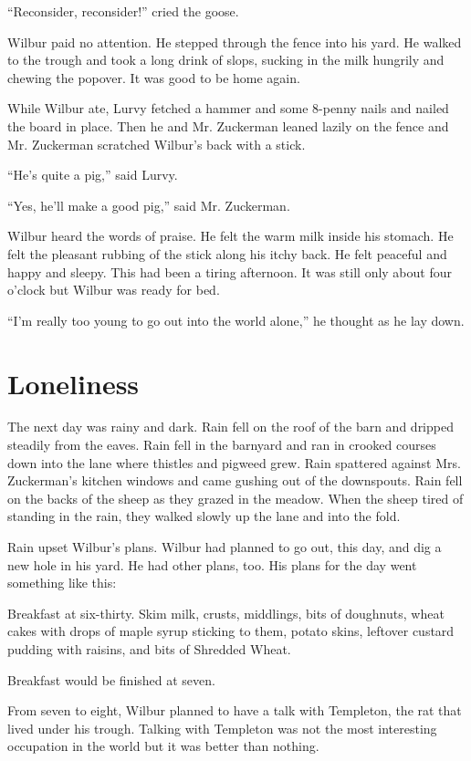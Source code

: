 \documentclass[a4paper, oneside]{book}
\begin{document}
 ``Reconsider, reconsider!'' cried the goose.  

  Wilbur paid no attention. He stepped through the fence into his
yard. He walked to the trough and took a long drink of slops,
sucking in the milk hungrily and chewing the popover. It was good
to be home again.

 While Wilbur ate, Lurvy fetched a hammer and some 8-penny
nails and nailed the board in place. Then he and Mr. Zuckerman
leaned lazily on the fence and Mr. Zuckerman scratched Wilbur's
back with a stick.

 ``He's quite a pig,'' said Lurvy.
 
 ``Yes, he'll make a good pig,'' said Mr. Zuckerman.
 
 Wilbur heard the words of praise. He felt the warm milk inside his
stomach. He felt the pleasant rubbing of the stick along his itchy
back. He felt peaceful and happy and sleepy. This had been a tiring
afternoon. It was still only about four o'clock but Wilbur was ready 
for bed.

 ``I'm really too young to go out into the world alone,'' he thought
as he lay down.


 
  \chapter{Loneliness}
 
 The next day was rainy and dark. Rain fell on the roof of the barn
and dripped steadily from the eaves. Rain fell in the barnyard and
ran in crooked courses down into the lane where thistles and
pigweed grew. Rain spattered against Mrs. Zuckerman's kitchen
windows and came gushing out of the downspouts. Rain fell on the
backs of the sheep as they grazed in the meadow. When the sheep
tired of standing in the rain, they walked slowly up the lane and
into the fold.

 Rain upset Wilbur's plans. Wilbur had planned to go out, this day,
and dig a new hole in his yard. He had other plans, too. His plans
for the day went something like this: 

Breakfast at six-thirty. Skim milk, crusts, middlings, bits of
doughnuts, wheat cakes with drops of maple syrup sticking to them,
potato skins, leftover custard pudding with raisins, and bits of 
Shredded Wheat.

 Breakfast would be finished at seven.
 
 From seven to eight, Wilbur planned to have a talk with
Templeton, the rat that lived under his trough. Talking with
Templeton was not the most interesting occupation in the world
but it was better than nothing.
\end{document}
